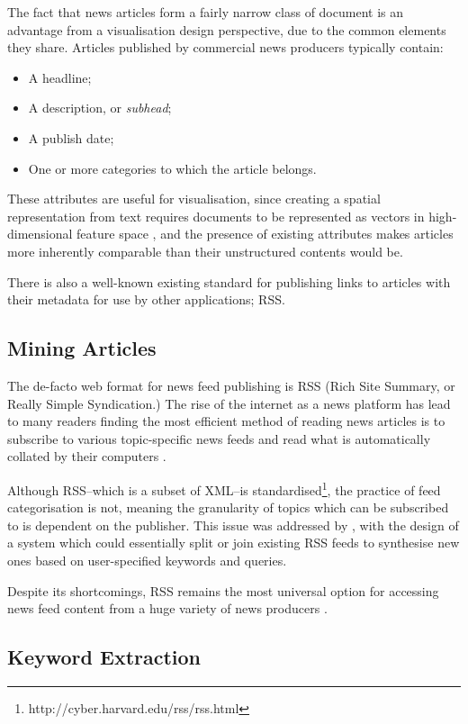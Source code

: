 The fact that news articles form a fairly narrow class of document is an advantage from a visualisation design perspective, due to the common elements they share. Articles published by commercial news producers typically contain:
\begin{itemize}[noitemsep]
	\item A headline;
	\item A description, or \textit{subhead};
	\item A publish date;
	\item One or more categories to which the article belongs.
\end{itemize}
These attributes are useful for visualisation, since creating a spatial representation from text requires documents to be represented as vectors in high-dimensional feature space \citep{VisualizingTheNonVisual}, and the presence of existing attributes makes articles more inherently comparable than their unstructured contents would be.

There is also a well-known existing standard for publishing links to articles with their metadata for use by other applications; RSS.

\subsection{Mining Articles}
The de-facto web format for news feed publishing is RSS (Rich Site Summary, or Really Simple Syndication.) The rise of the internet as a news platform has lead to many readers finding the most efficient method of reading news articles is to subscribe to various topic-specific news feeds and read what is automatically collated by their computers \citep{Nreader}.

Although RSS--which is a subset of XML--is standardised\footnote{http://cyber.harvard.edu/rss/rss.html}, the practice of feed categorisation is not, meaning the granularity of topics which can be subscribed to is dependent on the publisher. This issue was addressed by \citet{PersonalNewsRss}, with the design of a system which could essentially split or join existing RSS feeds to synthesise new ones based on user-specified keywords and queries.

Despite its shortcomings, RSS remains the most universal option for accessing news feed content from a huge variety of news producers 
\citep{MiningAndVisualisingInformationFromRSSFeeds}.

\subsection{Keyword Extraction}

